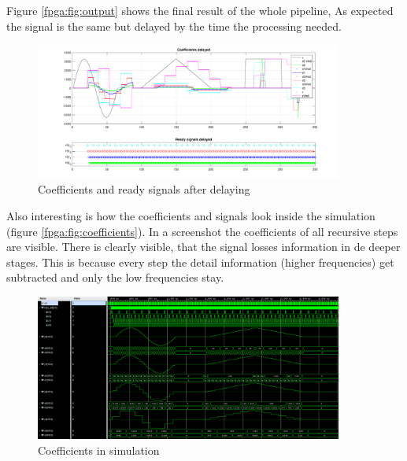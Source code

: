 \begin{refsection}
Figure \ref{fpga:fig:output} shows the final result of the whole pipeline, As expected the signal is the same but delayed by the time the processing needed. 
\begin{figure}[h]
	\centering
	\includegraphics[width=0.9\textwidth]{./images/coefs_delayed.pdf}
	\caption{Coefficients and ready signals after delaying \label{fpga:fig:coeff_delayed}}
\end{figure}

Also interesting is how the coefficients and signals look inside the simulation (figure \ref{fpga:fig:coefficients}). 
In a screenshot the coefficients of all recursive steps are visible. 
There is clearly visible, that the signal losses information in de deeper stages. 
This is because every step the detail information (higher frequencies) get subtracted and only the low frequencies stay.

\begin{figure}[h]
	\centering
	\includegraphics[width=0.9\textwidth]{./images/inv_branching_screenshot.png}
	\caption{Coefficients in simulation \label{fpga:fig:sim}}
\end{figure}

\newpage


\end{refsection}
